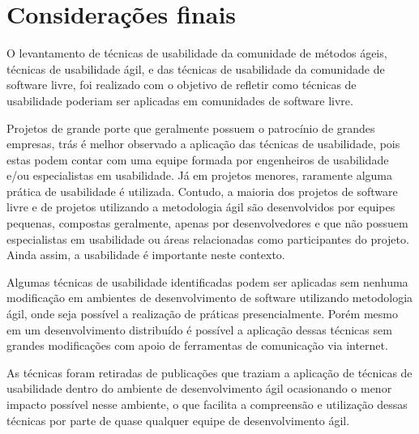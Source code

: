 \documentclass[12pt]{article}
\begin{document}
\section{Considerações finais}
\label{sec:con_final}

O levantamento de técnicas de usabilidade da comunidade de métodos ágeis, técnicas de usabilidade ágil, e das técnicas de usabilidade da comunidade de software livre, foi realizado com o objetivo de refletir como técnicas de usabilidade poderiam ser aplicadas em comunidades de software livre.

%
Projetos de grande porte que geralmente possuem o patrocínio de grandes empresas, trás é melhor observado a aplicação das técnicas de usabilidade, pois estas podem contar com uma equipe formada por engenheiros de usabilidade e/ou especialistas em usabilidade. Já em projetos menores, raramente alguma prática de usabilidade é utilizada. Contudo, a maioria dos projetos de software livre e de projetos utilizando a metodologia ágil são desenvolvidos por equipes pequenas, compostas geralmente, apenas por desenvolvedores e que não possuem especialistas em usabilidade ou áreas relacionadas como participantes do projeto. Ainda assim, a usabilidade é importante neste contexto.

%
Algumas técnicas de usabilidade identificadas podem ser aplicadas sem nenhuma modificação em ambientes de desenvolvimento de software utilizando metodologia ágil, onde seja possível a realização de práticas presencialmente. Porém mesmo em um desenvolvimento distribuído é possível a aplicação dessas técnicas sem grandes modificações com apoio de ferramentas de comunicação via internet.

%
As técnicas foram retiradas de publicações que traziam a aplicação de técnicas de usabilidade dentro do ambiente de desenvolvimento ágil ocasionando o menor impacto possível nesse ambiente, o que facilita a compreensão e utilização dessas técnicas por parte de quase qualquer equipe de desenvolvimento ágil.



\end{document}
